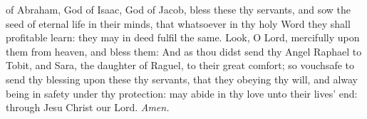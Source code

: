 {} of Abraham, God of Isaac, God of Jacob, bless these thy servants, and sow the seed of eternal life in their minds, that whatsoever in thy holy Word they shall profitable learn: they may in deed fulfil the same. Look, O Lord, mercifully upon them from heaven, and bless them: And as thou didst send thy Angel Raphael to Tobit, and Sara, the daughter of Raguel, to their great comfort; so vouchsafe to send thy blessing upon these thy servants, that they obeying thy will, and alway being in safety under thy protection: may abide in thy love unto their lives' end: through Jesu Christ our Lord. \textit{Amen.}



